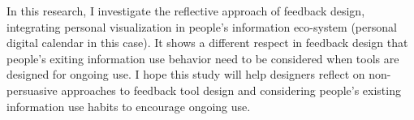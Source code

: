 \documentclass[12pt,oneside]{book}
\begin{document}
In this research, I investigate the reflective approach of feedback design, integrating personal visualization in people's information eco-system (personal digital calendar in this case). It shows a different respect in feedback design that people's exiting information use behavior need to be considered when tools are designed for ongoing use. I hope this study will help designers reflect on non-persuasive approaches to feedback tool design and considering people's existing information use habits to encourage ongoing use.


\appendix
\label{chap:ipaq}



	
	
\end{document}
